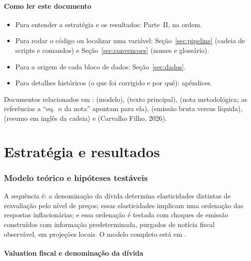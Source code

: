 \documentclass[12pt,a4paper]{article}
\begin{document}
\subsection{Como ler este documento}

\begin{itemize}[leftmargin=1.2cm]
    \item Para entender a estratégia e os resultados: Parte~II, na ordem.
    \item Para rodar o código ou localizar uma variável: Seção~\ref{sec:pipeline}
    (cadeia de scripts e comandos) e Seção~\ref{sec:convencoes} (nomes e glossário).
    \item Para a origem de cada bloco de dados: Seção~\ref{sec:dados}.
    \item Para detalhes históricos (o que foi corrigido e por quê): apêndices.
\end{itemize}

Documentos relacionados em :  (modelo),
 (texto principal),
 (nota
metodológica; as referências a ``eq.~\(n\) da nota'' apontam para ela),
 (emissão bruta versus líquida), 
(resumo em inglês da cadeia) e  (Carvalho Filho, 2026).

\part{Estratégia e resultados}

\section{Modelo teórico e hipóteses testáveis}\label{sec:teoria}

A sequência é: a denominação da dívida determina elasticidades distintas de
reavaliação pelo nível de preços; essas elasticidades implicam uma ordenação das
respostas inflacionárias; e essa ordenação é testada com choques de emissão
construídos com informação predeterminada, purgados de notícia fiscal observável,
em projeções locais. O modelo completo está em .

\subsection{Valuation fiscal e denominação da dívida}
\end{document}

